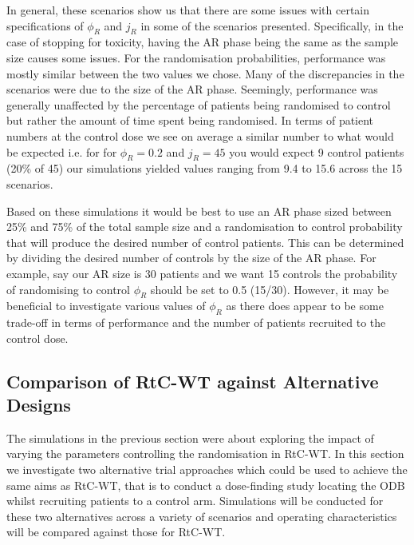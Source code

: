 In general, these scenarios show us that there are some issues with certain specifications of $\phi_R$ and $j_R$ in some of the scenarios presented. Specifically, in the case of stopping for toxicity, having the AR phase being the same as the sample size causes some issues. For the randomisation probabilities, performance was mostly similar between the two values we chose. Many of the discrepancies in the scenarios were due to the size of the AR phase. Seemingly, performance was generally unaffected by the percentage of patients being randomised to control but rather the amount of time spent being randomised. In terms of patient numbers at the control dose we see on average a similar number to what would be expected i.e. for  for $\phi_R = 0.2$ and  $j_R = 45$ you would expect 9 control patients (20\% of 45) our simulations yielded values ranging from 9.4 to 15.6 across the 15 scenarios. 

Based on these simulations it would be best to use an AR phase sized between 25\% and 75\% of the total sample size and a randomisation to control probability that will produce the desired number of control patients. This can be determined by dividing the desired number of controls by the size of the AR phase. For example, say our AR size is 30 patients and we want 15 controls the probability of randomising to control $\phi_R$ should be set to 0.5 (15/30). However, it may be beneficial to investigate various values of $\phi_R$ as there does appear to be some trade-off in terms of performance and the number of patients recruited to the control dose.

\subsection{Comparison of RtC-WT against Alternative Designs }
\label{WT:CompAltDesigns}

The simulations in the previous section were about exploring the impact of varying the parameters controlling the randomisation in RtC-WT. In this section we investigate two alternative trial approaches which could be used to achieve the same aims as RtC-WT, that is to conduct a dose-finding study locating the ODB whilst recruiting patients to a control arm. Simulations will be conducted for these two alternatives across a variety of scenarios and operating characteristics will be compared against those for RtC-WT.       


